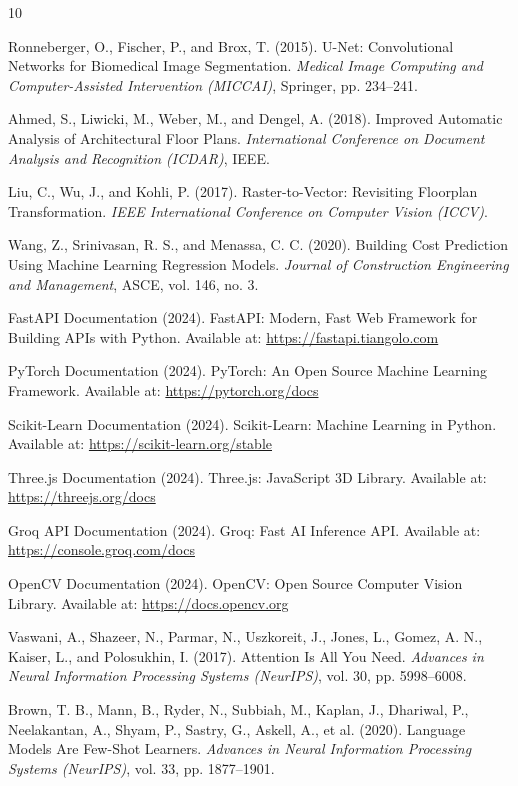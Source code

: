\documentclass[12pt]{report}
\begin{document}
\singlespacing
\begin{thebibliography}{10}

 Ronneberger, O., Fischer, P., and Brox, T. (2015). U-Net: Convolutional Networks for Biomedical Image Segmentation. \textit{Medical Image Computing and Computer-Assisted Intervention (MICCAI)}, Springer, pp. 234--241.

 Ahmed, S., Liwicki, M., Weber, M., and Dengel, A. (2018). Improved Automatic Analysis of Architectural Floor Plans. \textit{International Conference on Document Analysis and Recognition (ICDAR)}, IEEE.

 Liu, C., Wu, J., and Kohli, P. (2017). Raster-to-Vector: Revisiting Floorplan Transformation. \textit{IEEE International Conference on Computer Vision (ICCV)}.

 Wang, Z., Srinivasan, R. S., and Menassa, C. C. (2020). Building Cost Prediction Using Machine Learning Regression Models. \textit{Journal of Construction Engineering and Management}, ASCE, vol. 146, no. 3.

 FastAPI Documentation (2024). FastAPI: Modern, Fast Web Framework for Building APIs with Python. Available at: \url{https://fastapi.tiangolo.com}

 PyTorch Documentation (2024). PyTorch: An Open Source Machine Learning Framework. Available at: \url{https://pytorch.org/docs}

 Scikit-Learn Documentation (2024). Scikit-Learn: Machine Learning in Python. Available at: \url{https://scikit-learn.org/stable}

 Three.js Documentation (2024). Three.js: JavaScript 3D Library. Available at: \url{https://threejs.org/docs}

 Groq API Documentation (2024). Groq: Fast AI Inference API. Available at: \url{https://console.groq.com/docs}

 OpenCV Documentation (2024). OpenCV: Open Source Computer Vision Library. Available at: \url{https://docs.opencv.org}

 Vaswani, A., Shazeer, N., Parmar, N., Uszkoreit, J., Jones, L., Gomez, A. N., Kaiser, L., and Polosukhin, I. (2017). Attention Is All You Need. \textit{Advances in Neural Information Processing Systems (NeurIPS)}, vol. 30, pp. 5998--6008.

 Brown, T. B., Mann, B., Ryder, N., Subbiah, M., Kaplan, J., Dhariwal, P., Neelakantan, A., Shyam, P., Sastry, G., Askell, A., et al. (2020). Language Models Are Few-Shot Learners. \textit{Advances in Neural Information Processing Systems (NeurIPS)}, vol. 33, pp. 1877--1901.


\end{thebibliography}
\end{document}
